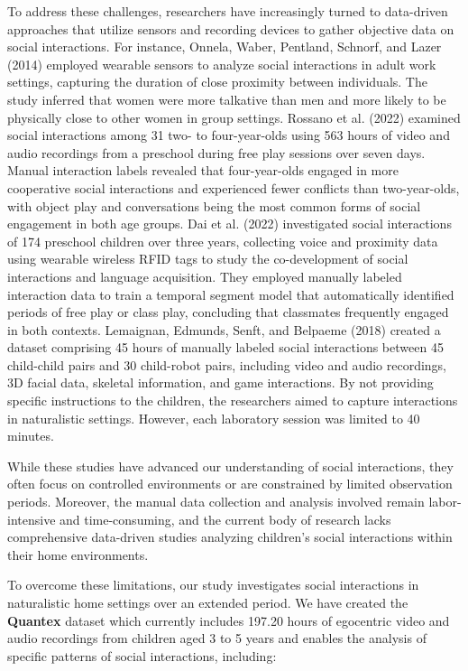 \documentclass[
  man,floatsintext]{apa6}
\begin{document}
To address these challenges, researchers have increasingly turned to data-driven approaches that utilize sensors and recording devices to gather objective data on social interactions. For instance, Onnela, Waber, Pentland, Schnorf, and Lazer (2014) employed wearable sensors to analyze social interactions in adult work settings, capturing the duration of close proximity between individuals. The study inferred that women were more talkative than men and more likely to be physically close to other women in group settings. Rossano et al. (2022) examined social interactions among 31 two- to four-year-olds using 563 hours of video and audio recordings from a preschool during free play sessions over seven days. Manual interaction labels revealed that four-year-olds engaged in more cooperative social interactions and experienced fewer conflicts than two-year-olds, with object play and conversations being the most common forms of social engagement in both age groups. Dai et al. (2022) investigated social interactions of 174 preschool children over three years, collecting voice and proximity data using wearable wireless RFID tags to study the co-development of social interactions and language acquisition. They employed manually labeled interaction data to train a temporal segment model that automatically identified periods of free play or class play, concluding that classmates frequently engaged in both contexts. Lemaignan, Edmunds, Senft, and Belpaeme (2018) created a dataset comprising 45 hours of manually labeled social interactions between 45 child-child pairs and 30 child-robot pairs, including video and audio recordings, 3D facial data, skeletal information, and game interactions. By not providing specific instructions to the children, the researchers aimed to capture interactions in naturalistic settings. However, each laboratory session was limited to 40 minutes.

While these studies have advanced our understanding of social interactions, they often focus on controlled environments or are constrained by limited observation periods. Moreover, the manual data collection and analysis involved remain labor-intensive and time-consuming, and the current body of research lacks comprehensive data-driven studies analyzing children's social interactions within their home environments.

To overcome these limitations, our study investigates social interactions in naturalistic home settings over an extended period. We have created the \textbf{Quantex} dataset which currently includes 197.20 hours of egocentric video and audio recordings from children aged 3 to 5 years and enables the analysis of specific patterns of social interactions, including:
\end{document}
